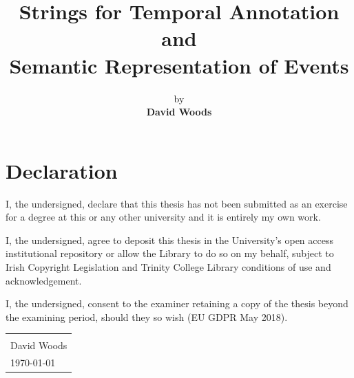 \documentclass[a4paper,12pt,leqno]{article}
\title{\textbf{Strings for Temporal Annotation and\\Semantic Representation of Events}}
\author{by\\{\textbf{David Woods}}\bigskip\bigskip}
\date{\parbox{\linewidth}{\centering%
		{\large A dissertation submitted\\in fulfillment of the requirements\\for the Degree of\\\textbf{Doctor of Philosophy}}\\		
		\bigskip\bigskip\bigskip
		{\Large \textbf{University of Dublin, Trinity College}}\\\endgraf \monthyeardate\today}{\small \vspace{\fill} Supervised by: Dr Tim Fernando, Dr Carl Vogel}}
\begin{document}
\maketitle
\thispagestyle{empty}

\newpage
{}
\section*{Declaration}
\noindent
I, the undersigned, declare that this thesis has not been submitted as an exercise for a degree at this or any other university and it is entirely my own work.\par

\vspace{2em}

\noindent
I, the undersigned, agree to deposit this thesis in the University's open access institutional repository or allow the Library to do so on my behalf, subject to Irish Copyright Legislation and Trinity College Library conditions of use and acknowledgement.\par

\vspace{2em}

\noindent
I, the undersigned, consent to the examiner retaining a copy of the thesis beyond the examining period, should they so wish (EU GDPR May 2018).

\vspace{\fill}

\begin{table}[!htbp]
	\flushright
	\begin{tabular}{l}
		\makebox[10cm]{\hrulefill}\\[0.5cm]
		David Woods\\[0.25cm]
		{\monthyeardate\today}
	\end{tabular}
\end{table}

\vspace{5em}
\end{document}
